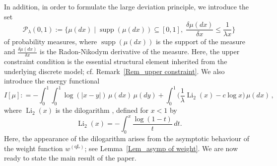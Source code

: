 \documentclass{amsart}
\newcommand{\supp}{\operatorname{supp}}
\newcommand{\Li}{\operatorname{Li}}
\theoremstyle{plain}
\theoremstyle{remark}
\numberwithin{equation}{section}
\begin{document}
In addition, in order to formulate the large deviation principle, we introduce the set 
\begin{equation}
\label{eq:prob_space}
    \mathcal{P}_{\lambda}(0,1):=\bigg\{ \mu(dx)\;\vert\; \supp(\mu(dx))\subseteq[0,1],\; \frac{\delta\mu(dx)}{\delta x}\leq \frac{1}{\lambda x}\bigg\}
\end{equation}
 of probability measures, where $\supp(\mu(dx))$ is the support of the measure and $\frac{\delta\mu(dx)}{\delta x}$ is the Radon-Nikodym derivative of the measure. Here, the upper constraint condition is the essential structural element inherited from the underlying discrete model; cf. Remark~\ref{Rem_upper constraint}. 
We also introduce the energy functional
 \begin{equation}
    \label{eq:functional_rhp}
        I[\mu] : = - \int_{0}^{1}\int_{0}^{1} \log(|x-y|)\, \mu(dx) \, \mu(dy)  + \int_0^1 \Big( \frac{1}{\lambda}\Li_2(x)-c \log x \Big)\, \mu(dx)\,,
    \end{equation}
where $\Li_2(x)$ is the dilogarithm \cite[Chapter~25.12]{NIST}, defined for 
$x<1$ by
    \begin{equation}
    \label{eq:Li2_def}
        \Li_2(x) = - \int_0^x \frac{\log(1-t)}{t}\, dt.
    \end{equation}
Here, the appearance of the dilogarithm arises from the asymptotic behaviour of the weight function $w^{(\mathrm{qL})}$; see Lemma~\ref{Lem_asymp of weight}. We are now ready to state the main result of the paper. 
\end{document}
